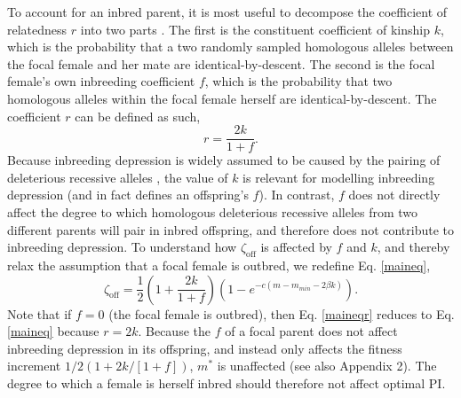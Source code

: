 \documentclass[12pt]{article}
\begin{document}
To account for an inbred parent, it is most useful to decompose the coefficient of relatedness $r$ into two parts \cite[see][]{Hamilton1972, Michod1979}. The first is the constituent coefficient of kinship $k$, which is the probability that a two randomly sampled homologous alleles between the focal female and her mate are identical-by-descent. The second is the focal female's own inbreeding coefficient $f$, which is the probability that two homologous alleles within the focal female herself are identical-by-descent. The coefficient $r$ can be defined as such,
\begin{equation} \label{rdef}
r = \frac{2k}{1 + f}.
\end{equation}
Because inbreeding depression is widely assumed to be caused by the pairing of deleterious recessive alleles \cite[][]{Charlesworth2009}, the value of $k$ is relevant for modelling inbreeding depression (and in fact defines an offspring's $f$). In contrast, $f$ does not directly affect the degree to which homologous deleterious recessive alleles from two different parents will pair in inbred offspring, and therefore does not contribute to inbreeding depression. To understand how $\zeta_{\textrm{off}}$ is affected by $f$ and $k$, and thereby relax the assumption that a focal female is outbred, we redefine Eq. \ref{maineq},
\begin{equation} \label{maineqr}
\zeta_{\textrm{off}} = \frac{1}{2}\left(1+\frac{2k}{1+f}\right)\left(1-e^{-c\left(m-m_{min}-2\beta k\right)}\right).
\end{equation}
Note that if $f=0$ (the focal female is outbred), then Eq. \ref{maineqr} reduces to Eq. \ref{maineq} because $r=2k$. Because the $f$ of a focal parent does not affect inbreeding depression in its offspring, and instead only affects the fitness increment $1/2\left(1+ 2 k / \left[1 + f\right]\right)$, $m^{*}$ is unaffected (see also Appendix 2). The degree to which a female is herself inbred should therefore not affect optimal PI.
\end{document}

